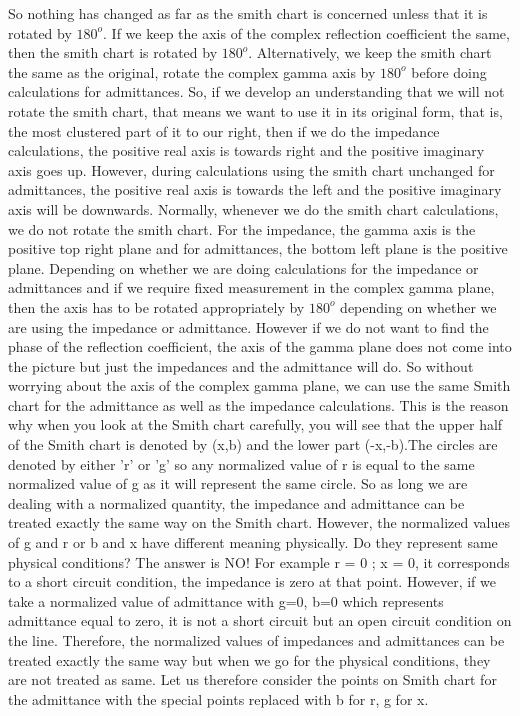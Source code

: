 So nothing has changed as far as the smith chart is concerned unless that it is rotated by $180^o$. If we keep the axis of the complex reflection coefficient the same, then the smith chart is rotated by $180^o$. Alternatively, we keep the smith chart the same as the original, rotate the complex gamma axis by $180^o$ before doing calculations for admittances. So, if we develop an understanding that we will not rotate the smith chart, that means we want to use it in its original form, that is, the most clustered part of it to our right, then if we do the impedance calculations, the positive real axis is towards right and the positive imaginary axis goes up. However, during calculations using the smith chart unchanged for admittances, the positive real axis is towards the left and the  positive imaginary axis will be downwards. Normally, whenever we do the smith chart calculations, we do not rotate the smith chart. For the impedance, the gamma axis is the  positive top right plane and for admittances, the bottom left plane is the positive plane. Depending on whether we are doing calculations for the impedance or admittances and if we require fixed measurement in the complex gamma plane, then the axis has to be rotated appropriately by $180^o$ depending on whether we are using the impedance or admittance. However if we do not want to find the phase of the reflection coefficient, the axis of the gamma plane does not come into the picture but just the impedances and the admittance will do. So without worrying about the axis of the complex gamma plane, we can use the same Smith chart for the admittance as well as the impedance calculations. This is the reason why when you look at the Smith chart carefully, you will see that the upper half of the Smith chart is denoted by (x,b) and the lower part (-x,-b).The circles are denoted by either 'r' or 'g' so any normalized value of r is equal to the same normalized value of g as it will represent the same circle. So as long we are dealing with a normalized quantity, the impedance and admittance can be treated exactly the same way on the Smith chart. However, the normalized values of g and r or b and x have different meaning physically. Do they represent same physical conditions? The answer is NO!  For example r = 0 ; x = 0, it corresponds to a short circuit condition, the impedance is zero at that point. However, if we take  a normalized value of admittance with g=0, b=0 which represents admittance equal to zero, it is not a short circuit but an open circuit condition on the line. Therefore, the normalized values of impedances and admittances can be  treated exactly the same way but when we go for the physical conditions, they are not treated as same. Let us therefore consider the points on Smith chart for the admittance with the special points replaced with b for r, g for x.\\
